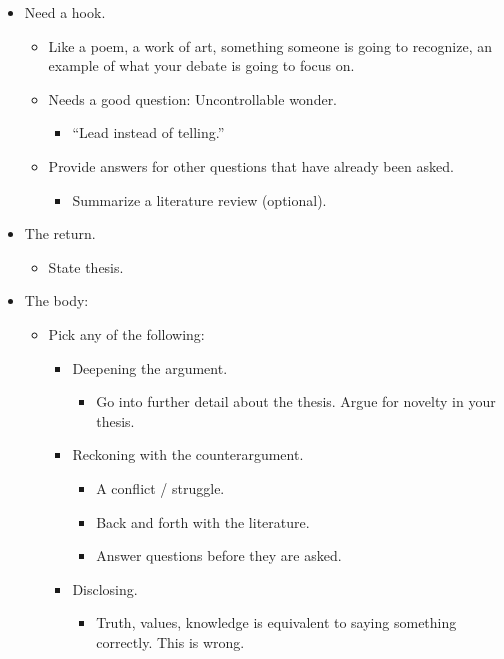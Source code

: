 \documentclass[11pt]{article}
\begin{document}
\begin{itemize}
    \item Need a hook.
    \begin{itemize}
        \item Like a poem, a work of art, something someone is going to recognize, an example of what your debate is going to focus on.
        \item Needs a good question: Uncontrollable wonder.
        \begin{itemize}
            \item ``Lead instead of telling.''
        \end{itemize}
        \item Provide answers for other questions that have already been asked.
        \begin{itemize}
            \item Summarize a literature review (optional).
        \end{itemize}
    \end{itemize}
    \item The return. 
    \begin{itemize}
        \item State thesis.
    \end{itemize}
    \item The body:
    \begin{itemize}
        \item Pick any of the following:
        \begin{itemize}
            \item Deepening the argument.
            \begin{itemize}
                \item Go into further detail about the thesis. Argue for novelty in your thesis.
            \end{itemize}
            \item Reckoning with the counterargument.
            \begin{itemize}
                \item A conflict / struggle. 
                \item Back and forth with the literature.
                \item Answer questions before they are asked. 
            \end{itemize}
            \item Disclosing.
            \begin{itemize}
                \item Truth, values, knowledge is equivalent to saying something correctly. This is wrong.

\end{itemize}
\end{itemize}
\end{itemize}
\end{itemize}
\end{document}
